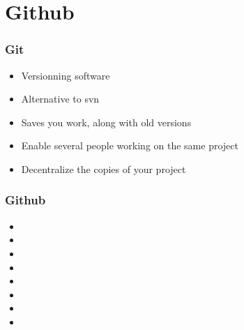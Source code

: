 \documentclass{beamer}
\begin{document}
\section{Github}
\begin{frame}
\frametitle{Git}
\begin{itemize}
\item Versionning software
\item Alternative to svn
\item Saves you work, along with old versions
\item Enable several people working on the same project
\item Decentralize the copies of your project
\end{itemize}
\end{frame}


\begin{frame}
\frametitle{Github}
\begin{itemize}
\item 
\item 
\item 
\item 
\item 
\item 
\item 
\item 
\end{itemize}
\end{frame}
\end{document}
